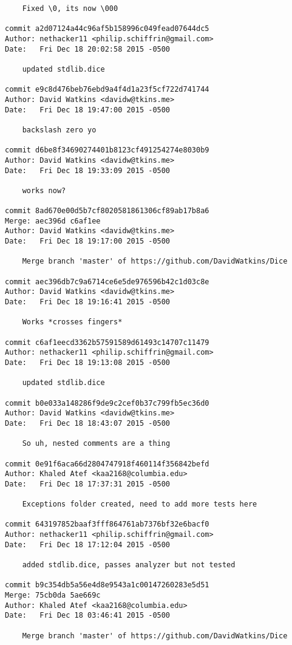 \begin{verbatim}
    Fixed \0, its now \000

commit a2d07124a44c96af5b158996c049fead07644dc5
Author: nethacker11 <philip.schiffrin@gmail.com>
Date:   Fri Dec 18 20:02:58 2015 -0500

    updated stdlib.dice

commit e9c8d476beb76ebd9a4f4d1a23f5cf722d741744
Author: David Watkins <davidw@tkins.me>
Date:   Fri Dec 18 19:47:00 2015 -0500

    backslash zero yo

commit d6be8f34690274401b8123cf491254274e8030b9
Author: David Watkins <davidw@tkins.me>
Date:   Fri Dec 18 19:33:09 2015 -0500

    works now?

commit 8ad670e00d5b7cf8020581861306cf89ab17b8a6
Merge: aec396d c6af1ee
Author: David Watkins <davidw@tkins.me>
Date:   Fri Dec 18 19:17:00 2015 -0500

    Merge branch 'master' of https://github.com/DavidWatkins/Dice

commit aec396db7c9a6714ce6e5de976596b42c1d03c8e
Author: David Watkins <davidw@tkins.me>
Date:   Fri Dec 18 19:16:41 2015 -0500

    Works *crosses fingers*

commit c6af1eecd3362b57591589d61493c14707c11479
Author: nethacker11 <philip.schiffrin@gmail.com>
Date:   Fri Dec 18 19:13:08 2015 -0500

    updated stdlib.dice

commit b0e033a148286f9de9c2cef0b37c799fb5ec36d0
Author: David Watkins <davidw@tkins.me>
Date:   Fri Dec 18 18:43:07 2015 -0500

    So uh, nested comments are a thing

commit 0e91f6aca66d2804747918f460114f356842befd
Author: Khaled Atef <kaa2168@columbia.edu>
Date:   Fri Dec 18 17:37:31 2015 -0500

    Exceptions folder created, need to add more tests here

commit 643197852baaf3fff864761ab7376bf32e6bacf0
Author: nethacker11 <philip.schiffrin@gmail.com>
Date:   Fri Dec 18 17:12:04 2015 -0500

    added stdlib.dice, passes analyzer but not tested

commit b9c354db5a56e4d8e9543a1c00147260283e5d51
Merge: 75cb0da 5ae669c
Author: Khaled Atef <kaa2168@columbia.edu>
Date:   Fri Dec 18 03:46:41 2015 -0500

    Merge branch 'master' of https://github.com/DavidWatkins/Dice


\end{verbatim}
